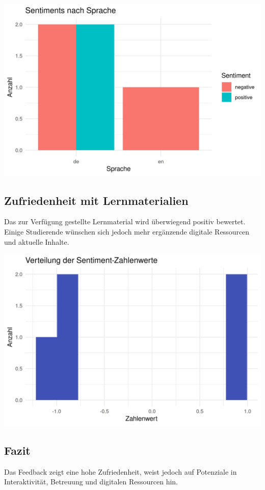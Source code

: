 \documentclass[
]{article}
\begin{document}
\includegraphics{Analyse_Diagramm2.png}

\subsection{Zufriedenheit mit
Lernmaterialien}\label{zufriedenheit-mit-lernmaterialien}

Das zur Verfügung gestellte Lernmaterial wird überwiegend positiv
bewertet. Einige Studierende wünschen sich jedoch mehr ergänzende
digitale Ressourcen und aktuelle Inhalte.

\includegraphics{Analyse_Diagramm3.png}

\subsection{Fazit}\label{fazit}

Das Feedback zeigt eine hohe Zufriedenheit, weist jedoch auf Potenziale
in Interaktivität, Betreuung und digitalen Ressourcen hin.
\end{document}
